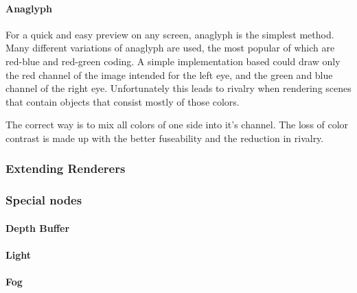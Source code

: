 \paragraph{Anaglyph}
For a quick and easy preview on any screen, anaglyph is the simplest method.
Many different variations of anaglyph are used, the most popular of which are red-blue and red-green coding.
A simple implementation based could draw only the red channel of the image intended for the left eye, and the green and blue channel of the right eye.
Unfortunately this leads to rivalry when rendering scenes that contain objects that consist mostly of those colors.

The correct way is to mix all colors of one side into it's channel.
The loss of color contrast is made up with the better fuseability and the reduction in rivalry.



\subsubsection{Extending Renderers}
\paragraph{}


\subsubsection{Special nodes\label{RendSpecial}}
\paragraph{}

\paragraph{Depth Buffer}
\paragraph{Light}
\paragraph{Fog}



